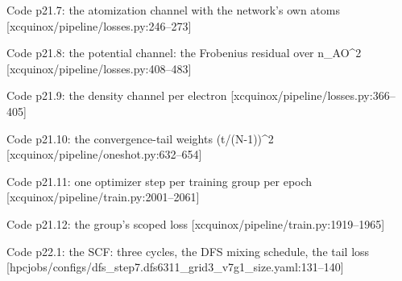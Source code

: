 \begin{frame}[allowframebreaks]{Code p21.7: the atomization channel with the network's own atoms [xcquinox/pipeline/losses.py:246--273]}
\label{code:p21_7_the_atomization_channel_with_the_network}
\end{frame}
\begin{frame}[allowframebreaks]{Code p21.8: the potential channel: the Frobenius residual over n\_AO\^{}2 [xcquinox/pipeline/losses.py:408--483]}
\label{code:p21_8_the_potential_channel_the_frobenius_resi}
\end{frame}
\begin{frame}[allowframebreaks]{Code p21.9: the density channel per electron [xcquinox/pipeline/losses.py:366--405]}
\label{code:p21_9_the_density_channel_per_electron}
\end{frame}
\begin{frame}[allowframebreaks]{Code p21.10: the convergence-tail weights (t/(N-1))\^{}2 [xcquinox/pipeline/oneshot.py:632--654]}
\label{code:p21_10_the_convergence_tail_weights_t_n_1_2}
\end{frame}
\begin{frame}[allowframebreaks]{Code p21.11: one optimizer step per training group per epoch [xcquinox/pipeline/train.py:2001--2061]}
\label{code:p21_11_one_optimizer_step_per_training_group_pe}
\end{frame}
\begin{frame}[allowframebreaks]{Code p21.12: the group's scoped loss [xcquinox/pipeline/train.py:1919--1965]}
\label{code:p21_12_the_group_s_scoped_loss}
\end{frame}
\begin{frame}[allowframebreaks]{Code p22.1: the SCF: three cycles, the DFS mixing schedule, the tail loss [hpcjobs/configs/dfs\_step7.dfs6311\_grid3\_v7g1\_size.yaml:131--140]}
\label{code:p22_1_the_scf_three_cycles_the_dfs_mixing_sche}
\end{frame}
